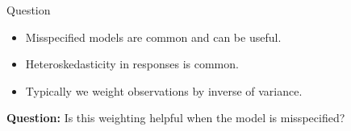 \documentclass[12pt]{beamer}
\begin{document}
\begin{frame}{Question}
\begin{itemize}
\item Misspecified models are common and can be useful.
\item Heteroskedasticity in responses is common.
\item Typically we weight observations by inverse of variance.
\end{itemize}

\vspace{.3in}
\textbf{Question:} Is this weighting helpful when the model is misspecified?

\end{frame}









\end{document}
